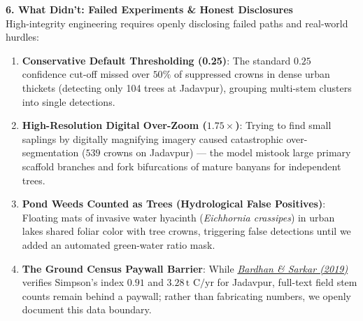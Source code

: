 \documentclass[10pt,a4paper]{article}
\begin{document}
\vspace{-0.4em}
\noindent\textbf{\large 6. What Didn't: Failed Experiments \& Honest Disclosures}\\[0.25em]
High-integrity engineering requires openly disclosing failed paths and real-world hurdles:
\begin{enumerate}
    \item \textbf{Conservative Default Thresholding (0.25)}: The standard $0.25$ confidence cut-off missed over $50\%$ of suppressed crowns in dense urban thickets (detecting only 104 trees at Jadavpur), grouping multi-stem clusters into single detections.
    \item \textbf{High-Resolution Digital Over-Zoom ($1.75\times$)}: Trying to find small saplings by digitally magnifying imagery caused catastrophic over-segmentation ($539$ crowns on Jadavpur) — the model mistook large primary scaffold branches and fork bifurcations of mature banyans for independent trees.
    \item \textbf{Pond Weeds Counted as Trees (Hydrological False Positives)}: Floating mats of invasive water hyacinth (\textit{Eichhornia crassipes}) in urban lakes shared foliar color with tree crowns, triggering false detections until we added an automated green-water ratio mask.
    \item \textbf{The Ground Census Paywall Barrier}: While \href{https://doi.org/10.36808/if/2019/v145i3/144454}{\textit{Bardhan \& Sarkar (2019)}} verifies Simpson's index $0.91$ and $3.28\,\text{t C/yr}$ for Jadavpur, full-text field stem counts remain behind a paywall; rather than fabricating numbers, we openly document this data boundary.
\end{enumerate}
\end{document}
